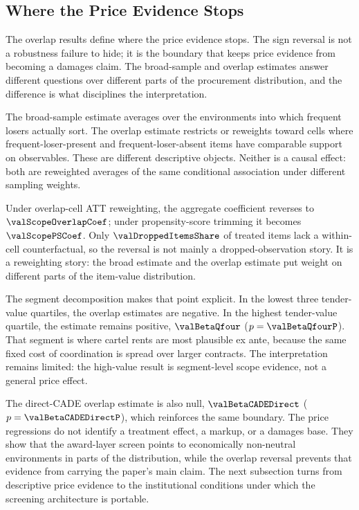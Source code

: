 \subsection{Where the Price Evidence Stops}
\label{sec:price_scope_v18}

The overlap results define where the price evidence stops. The
sign reversal is not a robustness failure to hide; it is the
boundary that keeps price evidence from becoming a damages
claim. The broad-sample and overlap estimates answer different
questions over different parts of the procurement distribution,
and the difference is what disciplines the interpretation.

The broad-sample estimate averages over the environments into
which frequent losers actually sort. The overlap estimate
restricts or reweights toward cells where frequent-loser-present
and frequent-loser-absent items have comparable support on
observables. These are different descriptive objects. Neither
is a causal effect: both are reweighted averages of the same
conditional association under different sampling weights.

Under overlap-cell ATT reweighting, the aggregate coefficient
reverses to $\valScopeOverlapCoef$; under propensity-score
trimming it becomes $\valScopePSCoef$. Only
$\valDroppedItemsShare$ of treated items lack a within-cell
counterfactual, so the reversal is not mainly a
dropped-observation story. It is a reweighting story: the broad
estimate and the overlap estimate put weight on different parts
of the item-value distribution.

The segment decomposition makes that point explicit. In the
lowest three tender-value quartiles, the overlap estimates are
negative. In the highest tender-value quartile, the estimate
remains positive, $\valBetaQfour$ ($p=\valBetaQfourP$). That
segment is where cartel rents are most plausible ex ante,
because the same fixed cost of coordination is spread over
larger contracts. The interpretation remains limited: the
high-value result is segment-level scope evidence, not a
general price effect.

The direct-CADE overlap estimate is also null,
$\valBetaCADEDirect$ ($p=\valBetaCADEDirectP$), which reinforces
the same boundary. The price regressions do not identify a
treatment effect, a markup, or a damages base. They show that
the award-layer screen points to economically non-neutral
environments in parts of the distribution, while the overlap
reversal prevents that evidence from carrying the paper's main
claim. The next subsection turns from descriptive price
evidence to the institutional conditions under which the
screening architecture is portable.

